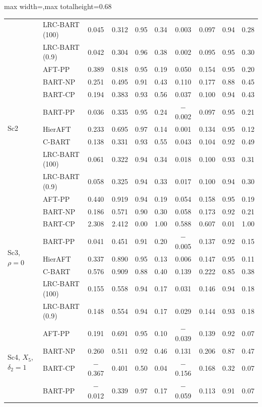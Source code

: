 \documentclass[11pt]{article}
\theoremstyle{definition}
\theoremstyle{plain}
\begin{document}
\begin{table}[htbp]
\begin{adjustbox}{max width=\textwidth,max totalheight=0.68\textheight}
\begin{tabular}{llcccccccc}
& LRC-BART (100) & 0.045 & 0.312 & 0.95 & 0.34 & 0.003 & 0.097 & 0.94 & 0.28 \\
& LRC-BART (0.9) & 0.042 & 0.304 & 0.96 & 0.38 & 0.002 & 0.095 & 0.95 & 0.30 \\
\midrule
\multirow{8}{*}{Sc2} & AFT-PP & 0.389 & 0.818 & 0.95 & 0.19 & 0.050 & 0.154 & 0.95 & 0.20 \\
& BART-NP & 0.251 & 0.495 & 0.91 & 0.43 & 0.110 & 0.177 & 0.88 & 0.45 \\
& BART-CP & 0.194 & 0.383 & 0.93 & 0.56 & 0.037 & 0.100 & 0.94 & 0.43 \\
& BART-PP & 0.036 & 0.335 & 0.95 & 0.24 & $-$0.002 & 0.097 & 0.95 & 0.21 \\
& HierAFT & 0.233 & 0.695 & 0.97 & 0.14 & 0.001 & 0.134 & 0.95 & 0.12 \\
& C-BART & 0.138 & 0.331 & 0.93 & 0.55 & 0.043 & 0.104 & 0.92 & 0.49 \\
& LRC-BART (100) & 0.061 & 0.322 & 0.94 & 0.34 & 0.018 & 0.100 & 0.93 & 0.31 \\
& LRC-BART (0.9) & 0.058 & 0.325 & 0.94 & 0.33 & 0.017 & 0.100 & 0.94 & 0.30 \\
\midrule
\multirow{8}{*}{Sc3, $\rho=0$} & AFT-PP & 0.440 & 0.919 & 0.94 & 0.19 & 0.054 & 0.158 & 0.95 & 0.19 \\
& BART-NP & 0.186 & 0.571 & 0.90 & 0.30 & 0.058 & 0.173 & 0.92 & 0.21 \\
& BART-CP & 2.308 & 2.412 & 0.00 & 1.00 & 0.588 & 0.607 & 0.01 & 1.00 \\
& BART-PP & 0.041 & 0.451 & 0.91 & 0.20 & $-$0.005 & 0.137 & 0.92 & 0.15 \\
& HierAFT & 0.337 & 0.890 & 0.95 & 0.13 & 0.006 & 0.147 & 0.95 & 0.11 \\
& C-BART & 0.576 & 0.909 & 0.88 & 0.40 & 0.139 & 0.222 & 0.85 & 0.38 \\
& LRC-BART (100) & 0.155 & 0.558 & 0.94 & 0.17 & 0.031 & 0.146 & 0.94 & 0.18 \\
& LRC-BART (0.9) & 0.148 & 0.554 & 0.94 & 0.17 & 0.029 & 0.144 & 0.93 & 0.18 \\
\midrule
\multirow{8}{*}{Sc4, $X_5$, $\delta_2=1$} & AFT-PP & 0.191 & 0.691 & 0.95 & 0.10 & $-$0.039 & 0.139 & 0.92 & 0.07 \\
& BART-NP & 0.260 & 0.511 & 0.92 & 0.46 & 0.131 & 0.206 & 0.87 & 0.47 \\
& BART-CP & $-$0.367 & 0.401 & 0.50 & 0.04 & $-$0.156 & 0.168 & 0.32 & 0.07 \\
& BART-PP & $-$0.012 & 0.339 & 0.97 & 0.17 & $-$0.059 & 0.113 & 0.91 & 0.07 \\

\end{tabular}
\end{adjustbox}
\end{table}
\end{document}

